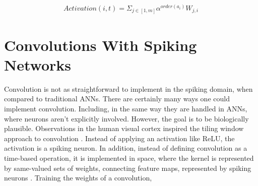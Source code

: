     \begin{align}
        Activation(i,t) = \Sigma_{j \in
          [1,m]}\alpha^{order(a_i)}W_{j,i} \label{eq:roc_activation}
    \end{align}
    
    \section{Convolutions With Spiking Networks}
    Convolution is not as straightforward to implement in the spiking domain,
    when compared to traditional ANNs. There are certainly many ways one could
    implement convolution. Including, in the same way they are handled in ANNs,
    where neurons aren't explicitly involved. However, the goal is to be
    biologically plausible. Observations in the human visual cortex inspired the
    tiling window approach to convolution \cite{wang_2016}. Instead of applying
    an activation like ReLU, the activation is a spiking neuron. In addition,
    instead of defining convolution as a time-based operation, it is implemented
    in space, where the kernel is represented by same-valued sets of weights,
    connecting feature maps, represented by spiking neurons
    \cite{mozafari_2018}. Training the weights of a convolution,
    
    
